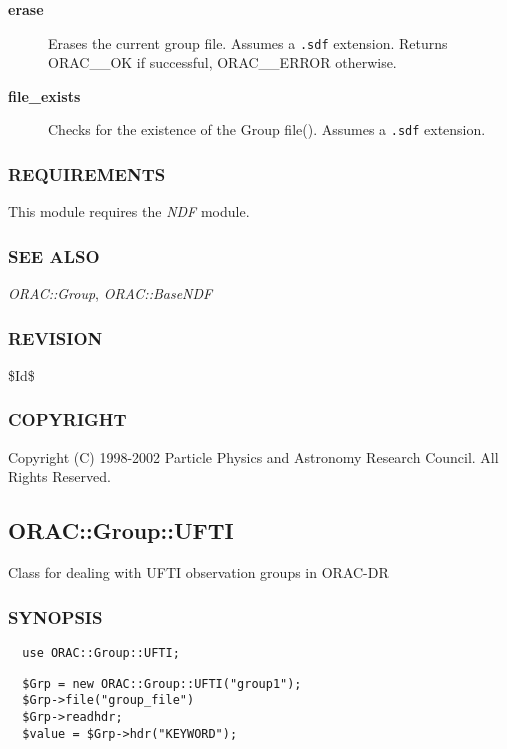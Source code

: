 \begin{description}
\begin{description}
\begin{description}
\item[{\textbf{erase}}] \mbox{}

Erases the current group file. Assumes a \texttt{.sdf} extension.
Returns ORAC\_\_OK if successful, ORAC\_\_ERROR otherwise.


\item[{\textbf{file\_exists}}] \mbox{}

Checks for the existence of the Group file(). Assumes a \texttt{.sdf}
extension.

\end{description}
\subsubsection*{REQUIREMENTS\label{ORAC::Group::NDF_REQUIREMENTS}}


This module requires the \emph{NDF} module.

\subsubsection*{SEE ALSO\label{ORAC::Group::NDF_SEE_ALSO}}


\emph{ORAC::Group}, \emph{ORAC::BaseNDF}

\subsubsection*{REVISION\label{ORAC::Group::NDF_REVISION}}


\$Id\$

\subsubsection*{COPYRIGHT\label{ORAC::Group::NDF_COPYRIGHT}}


Copyright (C) 1998-2002 Particle Physics and Astronomy Research
Council. All Rights Reserved.

\subsection{ORAC::Group::UFTI\label{ORAC::Group::UFTI}}


Class for dealing with UFTI observation groups in ORAC-DR

\subsubsection*{SYNOPSIS\label{ORAC::Group::UFTI_SYNOPSIS}}
\begin{verbatim}
  use ORAC::Group::UFTI;
\end{verbatim}
\begin{verbatim}
  $Grp = new ORAC::Group::UFTI("group1");
  $Grp->file("group_file")
  $Grp->readhdr;
  $value = $Grp->hdr("KEYWORD");
\end{verbatim}

\end{description}
\end{description}
